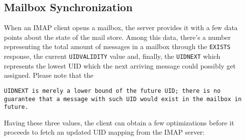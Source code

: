 \documentclass[trojita]{subfiles}
\begin{document}
\subsection{Mailbox Synchronization}

When an IMAP client opens a mailbox, the server provides it with a few data points about the state of the mail store.
Among this data, there's a number representing the total amount of messages in a mailbox through the {\tt EXISTS}
response, the current {\tt UIDVALIDITY} value and, finally, the {\tt UIDNEXT} which represents the lowest UID which the
next arriving message could possibly get assigned.  Please note that the {\tt UIDNEXT is merely a lower bound of the
future UID; there is no guarantee that a message with such UID would exist in the mailbox in future.

Having these three values, the client can obtain a few optimizations before it proceeds to fetch an updated UID mapping
from the IMAP server:

}
\end{document}
